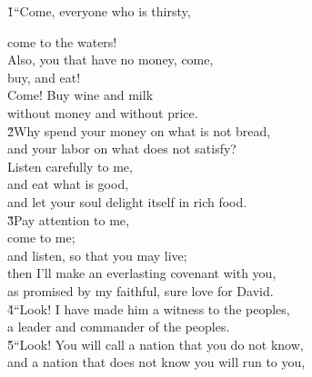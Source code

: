 \v{1}``Come, everyone who is thirsty,

\begin{poetry}
\poemll    come to the waters! \\
\poeml Also, you that have no money, come, \\
\poemll    buy, and eat! \\
\poeml Come! Buy wine and milk \\
\poemll    without money and without price. \\
\poeml \v{2}Why spend your money on what is not bread, \\
\poemll    and your labor on what does not satisfy? \\
\poeml Listen carefully to me, \\
\poemll    and eat what is good, \\
\poemlll       and let your soul delight itself in rich food. \\
\poeml \v{3}Pay attention to me, \\
\poemll    come to me; \\
\poemlll       and listen, so that you may live; \\
\poeml then I'll make an everlasting covenant with you, \\
\poemll    as promised by my faithful, sure love for David. \\
\poeml \v{4}``Look! I have made him a witness to the peoples, \\
\poemll    a leader and commander of the peoples. \\
\poeml \v{5}``Look! You will call a nation that you do not know, \\
\poemll    and a nation that does not know you will run to you, \\

\end{poetry}
